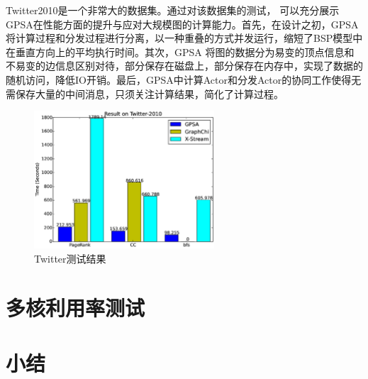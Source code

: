 Twitter2010是一个非常大的数据集。通过对该数据集的测试，
可以充分展示GPSA在性能方面的提升与应对大规模图的计算能力。首先，在设计之初，GPSA将计算过程和分发过程进行分离，以一种重叠的方式并发运行，缩短了BSP模型中在垂直方向上的平均执行时间。其次，GPSA 将图的数据分为易变的顶点信息和不易变的边信息区别对待，部分保存在磁盘上，部分保存在内存中，实现了数据的随机访问，降低IO开销。最后，GPSA中计算Actor和分发Actor的协同工作使得无需保存大量的中间消息，只须关注计算结果，简化了计算过程。

\begin{figure}[htbp]
\centering
\includegraphics[width=0.6\textwidth,scale=0.8]{myfigures/twittertime2.eps}
\caption{Twitter测试结果}
\label{res:twitter}
\end{figure}


\section{多核利用率测试}

\section{小结}






